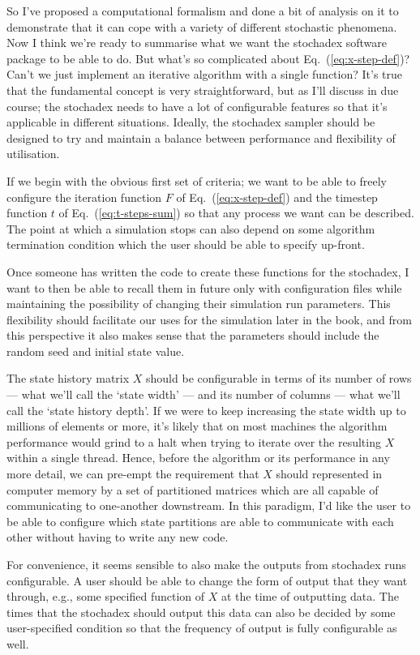 \documentclass{book}
\begin{document}
So I've proposed a computational formalism and done a bit of analysis on it to demonstrate that it can cope with a variety of different stochastic phenomena. Now I think we're ready to summarise what we want the stochadex software package to be able to do. But what's so complicated about Eq.~(\ref{eq:x-step-def})? Can't we just implement an iterative algorithm with a single function? It's true that the fundamental concept is very straightforward, but as I'll discuss in due course; the stochadex needs to have a lot of configurable features so that it's applicable in different situations. Ideally, the stochadex sampler should be designed to try and maintain a balance between performance and flexibility of utilisation.

If we begin with the obvious first set of criteria; we want to be able to freely configure the iteration function $F$ of Eq.~(\ref{eq:x-step-def}) and the timestep function $t$ of Eq.~(\ref{eq:t-steps-sum}) so that any process we want can be described. The point at which a simulation stops can also depend on some algorithm termination condition which the user should be able to specify up-front.

Once someone has written the code to create these functions for the stochadex, I want to then be able to recall them in future only with configuration files while maintaining the possibility of changing their simulation run parameters. This flexibility should facilitate our uses for the simulation later in the book, and from this perspective it also makes sense that the parameters should include the random seed and initial state value.

The state history matrix $X$ should be configurable in terms of its number of rows --- what we'll call the `state width' --- and its number of columns --- what we'll call the `state history depth'. If we were to keep increasing the state width up to millions of elements or more, it's likely that on most machines the algorithm performance would grind to a halt when trying to iterate over the resulting $X$ within a single thread. Hence, before the algorithm or its performance in any more detail, we can pre-empt the requirement that $X$ should represented in computer memory by a set of partitioned matrices which are all capable of communicating to one-another downstream. In this paradigm, I'd like the user to be able to configure which state partitions are able to communicate with each other without having to write any new code.

For convenience, it seems sensible to also make the outputs from stochadex runs configurable. A user should be able to change the form of output that they want through, e.g., some specified function of $X$ at the time of outputting data. The times that the stochadex should output this data can also be decided by some user-specified condition so that the frequency of output is fully configurable as well. 
\end{document}
